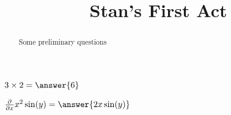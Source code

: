 \documentclass{ximera}
\title{Stan's First Act}
\begin{document}
\begin{abstract}
Some preliminary questions
\end{abstract}
\maketitle
\begin{question}
$3\times 2 = \answer{6}$
\end{question}
\begin{question}
	$\frac{\partial}{\partial x} x^2\sin(y) = \answer{2x\sin(y)}$
\end{question}
\end{document}
